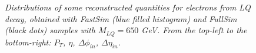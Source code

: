 \begin{figure}
\begin{center}
\begin{tabular}{c}
  \end{tabular}
  \caption{\small \sl Distributions of some reconstructed quantities for electrons from LQ decay, 
    obtained with FastSim (blue filled histogram) and FullSim (black dots) 
    samples with $M_{LQ}=650$ GeV.
    From the top-left to the bottom-right: $P_{T}$, $\eta$, $\Delta\phi_{in}$, $\Delta\eta_{in}$.}
  \label{fig:elecVariables}
  \end{center}
\end{figure}


%
